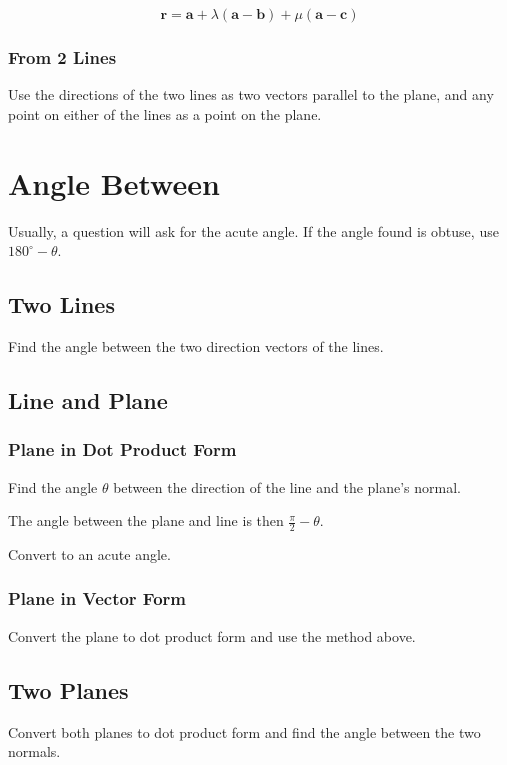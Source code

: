 \documentclass[a4paper,11pt]{report}
\newcommand{\bb}{\boldsymbol}
\begin{document}
$$
\bb{r} = \bb{a} + \lambda (\bb{a} - \bb{b}) + \mu (\bb{a} - \bb{c})
$$

\subsubsection{From 2 Lines}

Use the directions of the two lines as two vectors parallel to the plane, and
any point on either of the lines as a point on the plane.


\section{Angle Between}

Usually, a question will ask for the acute angle. If the angle found is obtuse,
use $180^\circ - \theta$.

\subsection{Two Lines}

Find the angle between the two direction vectors of the lines.

\subsection{Line and Plane}

\subsubsection{Plane in Dot Product Form}

Find the angle $\theta$ between the direction of the line and the plane's normal.

The angle between the plane and line is then $\frac{\pi}{2} - \theta$.

Convert to an acute angle.

\subsubsection{Plane in Vector Form}

Convert the plane to dot product form and use the method above.

\subsection{Two Planes}

Convert both planes to dot product form and find the angle between the two
normals.
\end{document}
